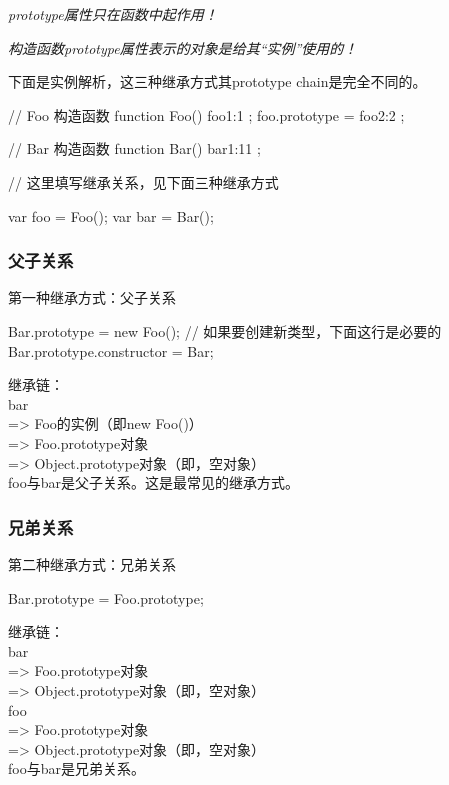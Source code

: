 \emph{prototype属性只在函数中起作用！}

\emph{构造函数prototype属性表示的对象是给其“实例”使用的！}

下面是实例解析，这三种继承方式其prototype chain是完全不同的。

\begin{javascriptcode}
  // Foo 构造函数
  function Foo() { foo1:1 };
  foo.prototype = { foo2:2 };

  // Bar 构造函数
  function Bar() { bar1:11 };

  // 这里填写继承关系，见下面三种继承方式

  var foo = Foo();
  var bar = Bar();
\end{javascriptcode}

\subsubsection[父子关系]{父子关系}
第一种继承方式：父子关系

\begin{javascriptcode}
  Bar.prototype = new Foo();
  // 如果要创建新类型，下面这行是必要的
  Bar.prototype.constructor = Bar;
\end{javascriptcode}

继承链：\\
bar\\
=> Foo的实例（即new Foo()）\\
=> Foo.prototype对象\\
=> Object.prototype对象（即{}，空对象）\\
foo与bar是父子关系。这是最常见的继承方式。

\subsubsection[兄弟关系]{兄弟关系}
第二种继承方式：兄弟关系

\begin{javascriptcode}
  Bar.prototype = Foo.prototype;
\end{javascriptcode}

继承链：\\
bar\\
=> Foo.prototype对象\\
=> Object.prototype对象（即{}，空对象）\\
foo\\
=> Foo.prototype对象\\
=> Object.prototype对象（即{}，空对象）\\
foo与bar是兄弟关系。

